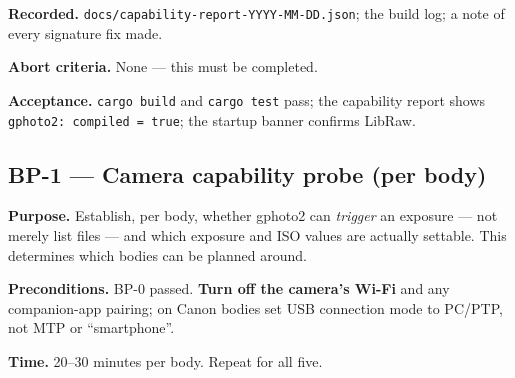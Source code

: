 \documentclass[11pt]{article}
\newcommand{\co}[1]{\texttt{\small #1}}
\begin{document}
\textbf{Recorded.} \co{docs/capability-report-YYYY-MM-DD.json}; the build log;
a note of every signature fix made.

\textbf{Abort criteria.} None --- this must be completed.

\textbf{Acceptance.} \co{cargo build} and \co{cargo test} pass; the capability
report shows \co{gphoto2: compiled = true}; the startup banner confirms LibRaw.

\subsection*{BP-1 --- Camera capability probe (per body)}

\textbf{Purpose.} Establish, per body, whether gphoto2 can \emph{trigger} an
exposure --- not merely list files --- and which exposure and ISO values are
actually settable. This determines which bodies can be planned around.

\textbf{Preconditions.} BP-0 passed. \textbf{Turn off the camera's Wi-Fi} and
any companion-app pairing; on Canon bodies set USB connection mode to PC/PTP,
not MTP or ``smartphone''.

\textbf{Time.} 20--30 minutes per body. Repeat for all five.
\end{document}
